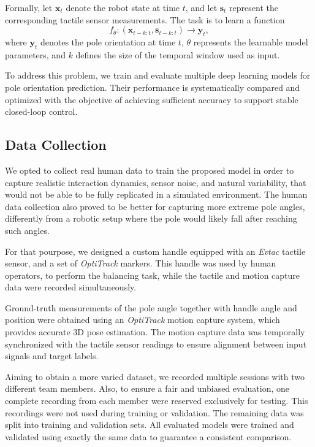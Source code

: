\documentclass{article}
\begin{document}
Formally, let $\mathbf{x}_t$ denote the robot state at time $t$,
and let $\mathbf{s}_t$ represent the corresponding tactile sensor measurements.
The task is to learn a function
\[
f_\theta : (\mathbf{x}_{t-k:t}, \mathbf{s}_{t-k:t}) \rightarrow \mathbf{y}_t,
\]
where $\mathbf{y}_t$ denotes the pole orientation at time $t$,
$\theta$ represents the learnable model parameters,
and $k$ defines the size of the temporal window used as input.

To address this problem, we train and evaluate multiple deep learning models
for pole orientation prediction. Their performance is systematically compared
and optimized with the objective of achieving sufficient accuracy to support
stable closed-loop control.

\subsection{Data Collection}
We opted to collect real human data to train the proposed model in order to capture realistic interaction dynamics,
sensor noise, and natural variability, that would not be able to be fully replicated in a simulated environment.
The human data collection also proved to be better for capturing more extreme pole angles, differently from a robotic setup where the pole would likely fall after reaching such angles.

For that pourpose, we designed a custom handle equipped with an \textit{Evtac} tactile sensor, and a set of \textit{OptiTrack} markers.
This handle was used by human operators, to perform the balancing task, while the tactile and motion capture data were recorded simultaneously.

Ground-truth measurements of the pole angle together with handle angle and position were obtained using an \textit{OptiTrack} motion capture system, which provides accurate 3D pose estimation.
The motion capture data was temporally synchronized with the tactile sensor readings to ensure alignment between input signals and target labels.

Aiming to obtain a more varied dataset, we recorded multiple sessions with two different team members.
Also, to ensure a fair and unbiased evaluation, one complete recording from each member were reserved exclusively for testing.
This recordings were not used during training or validation. The remaining data was split into training and validation sets.
All evaluated models were trained and validated using exactly the same data to guarantee a consistent comparison.
\end{document}
